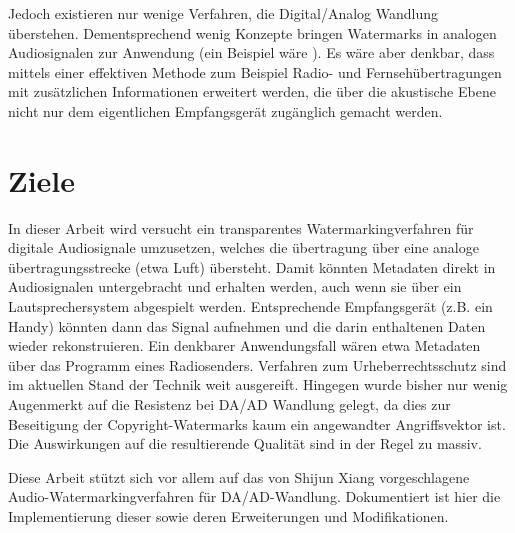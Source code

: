 Jedoch existieren nur wenige Verfahren, die Digital/Analog Wandlung \"uberstehen. Dementsprechend wenig Konzepte bringen Watermarks in analogen Audiosignalen zur Anwendung (ein Beispiel w\"are \cite{chang2012location}). Es w\"are aber denkbar, dass mittels einer effektiven Methode zum Beispiel Radio- und Fernseh\"ubertragungen mit zus\"atzlichen Informationen erweitert werden, die \"uber die akustische Ebene nicht nur dem eigentlichen Empfangsger\"at zug\"anglich gemacht werden.

\section{Ziele}

In dieser Arbeit wird versucht ein transparentes Watermarkingverfahren f\"ur digitale Audiosignale umzusetzen, welches die \"ubertragung \"uber eine analoge \"ubertragungsstrecke (etwa Luft) \"ubersteht. Damit k\"onnten Metadaten direkt in Audiosignalen untergebracht und erhalten werden, auch wenn sie \"uber ein Lautsprechersystem abgespielt werden. Entsprechende Empfangsger\"at (z.B. ein Handy) k\"onnten dann das Signal aufnehmen und die darin enthaltenen Daten wieder rekonstruieren. Ein denkbarer Anwendungsfall w\"aren etwa Metadaten \"uber das Programm eines Radiosenders. Verfahren zum Urheberrechtsschutz sind im aktuellen Stand der Technik weit ausgereift. Hingegen wurde bisher nur wenig Augenmerkt auf die Resistenz bei DA/AD Wandlung gelegt, da dies zur Beseitigung der Copyright-Watermarks kaum ein angewandter Angriffsvektor ist. Die Auswirkungen auf die resultierende Qualit\"at sind in der Regel zu massiv. 

Diese Arbeit st\"utzt sich vor allem auf das von Shijun Xiang\cite{xiang2007robust} vorgeschlagene Audio-Watermarkingverfahren f\"ur DA/AD-Wandlung. Dokumentiert ist hier die Implementierung dieser sowie deren Erweiterungen und Modifikationen. 



